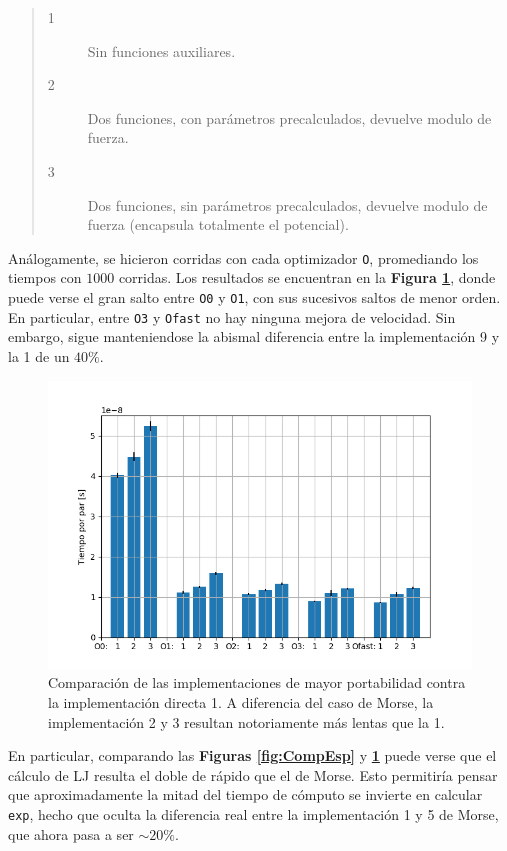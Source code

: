 \documentclass[twoside, 12pt]{article}
\begin{document}
\begin{quote}
\begin{description}
\item[1] Sin funciones auxiliares.
\item[2] Dos funciones, con parámetros precalculados, devuelve modulo de fuerza.
\item[3] Dos funciones, sin parámetros precalculados, devuelve modulo de fuerza (encapsula totalmente el potencial).
\end{description}
\end{quote}

An\'alogamente, se hicieron corridas con cada optimizador \texttt{O}, promediando los tiempos con $1000$ corridas. Los resultados se encuentran en la \textbf{Figura \ref{fig:CompEsp_LJ}}, donde puede verse el gran salto entre \texttt{O0} y \texttt{O1}, con sus sucesivos saltos de menor orden. En particular, entre \texttt{O3} y \texttt{Ofast} no hay ninguna mejora de velocidad. Sin embargo, sigue manteniendose la abismal diferencia entre la implementaci\'on 9 y la 1 de un $40\%$.

\begin{figure}[h]
	\centering
	\includegraphics[trim = 10mm 5mm 10mm 5mm, clip, scale=0.7]{Imagenes/Comp_tiempos_LJ.png}
	\caption{Comparaci\'on de las implementaciones de mayor portabilidad contra la implementaci\'on directa 1. A diferencia del caso de Morse, la implementaci\'on 2 y 3 resultan notoriamente m\'as lentas que la 1.}
	\label{fig:CompEsp_LJ}
\end{figure}

En particular, comparando las \textbf{Figuras \ref{fig:CompEsp}} y \textbf{\ref{fig:CompEsp_LJ}} puede verse que el c\'alculo de LJ resulta el doble de r\'apido que el de Morse. Esto permitir\'ia pensar que aproximadamente la mitad del tiempo de c\'omputo se invierte en calcular \texttt{exp}, hecho que oculta la diferencia real entre la implementaci\'on 1 y 5 de Morse, que ahora pasa a ser $\sim 20\%$. 
\end{document}
